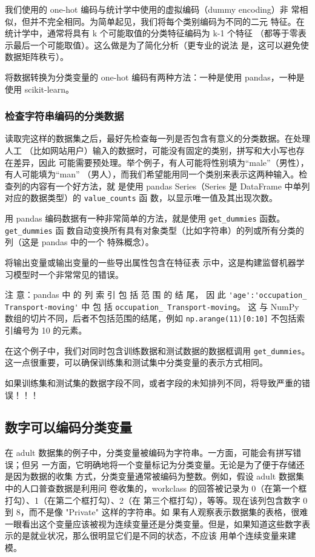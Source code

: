 \begin{tcolorbox}
    我们使用的 one-hot 编码与统计学中使用的虚拟编码（dummy encoding）非
    常相似，但并不完全相同。为简单起见，我们将每个类别编码为不同的二元
    特征。在统计学中，通常将具有 k 个可能取值的分类特征编码为 k-1 个特征
    （都等于零表示最后一个可能取值）。这么做是为了简化分析（更专业的说法
    是，这可以避免使数据矩阵秩亏）。
\end{tcolorbox}

将数据转换为分类变量的 one-hot 编码有两种方法：一种是使用 pandas，一种是使用
scikit-learn。

\subsubsection{检查字符串编码的分类数据}
读取完这样的数据集之后，最好先检查每一列是否包含有意义的分类数据。在处理人工
（比如网站用户）输入的数据时，可能没有固定的类别，拼写和大小写也存在差异，因此
可能需要预处理。举个例子，有人可能将性别填为“male”（男性），有人可能填为“man”
（男人），而我们希望能用同一个类别来表示这两种输入。检查列的内容有一个好方法，就
是使用 pandas Series（Series 是 DataFrame 中单列对应的数据类型）的 \verb|value_counts| 函
数，以显示唯一值及其出现次数。


用 pandas 编码数据有一种非常简单的方法，就是使用 \verb|get_dummies| 函数。\verb|get_dummies| 函
数自动变换所有具有对象类型（比如字符串）的列或所有分类的列（这是 pandas 中的一个
特殊概念）。

将输出变量或输出变量的一些导出属性包含在特征表
示中，这是构建监督机器学习模型时一个非常常见的错误。
\begin{tcolorbox}[colframe=red!70]
    注 意：pandas 中 的 列 索 引 包 括 范 围 的 结 尾， 因 此 \verb|'age':'occupation_ Transport-moving'| 中 包 括 \verb|occupation_ Transport-moving|。 这 与 NumPy 数组的切片不同，后者不包括范围的结尾，例如 \verb|np.arange(11)[0:10]| 不包括索引编号为 10 的元素。
\end{tcolorbox}

\begin{tcolorbox}[title=警告, colframe=red!90]
    在这个例子中，我们对同时包含训练数据和测试数据的数据框调用 \verb|get_dummies|。这一点很重要，可以确保训练集和测试集中分类变量的表示方式相同。

    如果训练集和测试集的数据字段不同，或者字段的未知排列不同，将导致严重的错误！！！
\end{tcolorbox}
\subsection{数字可以编码分类变量}
在 adult 数据集的例子中，分类变量被编码为字符串。一方面，可能会有拼写错误；但另
一方面，它明确地将一个变量标记为分类变量。无论是为了便于存储还是因为数据的收集
方式，分类变量通常被编码为整数。例如，假设 adult 数据集中的人口普查数据是利用问
卷收集的，workclass 的回答被记录为 0（在第一个框打勾）、1（在第二个框打勾）、2（在
第三个框打勾），等等。现在该列包含数字 0 到 8，而不是像 "Private" 这样的字符串。如
果有人观察表示数据集的表格，很难一眼看出这个变量应该被视为连续变量还是分类变量。但是，如果知道这些数字表示的是就业状况，那么很明显它们是不同的状态，不应该
用单个连续变量来建模。

